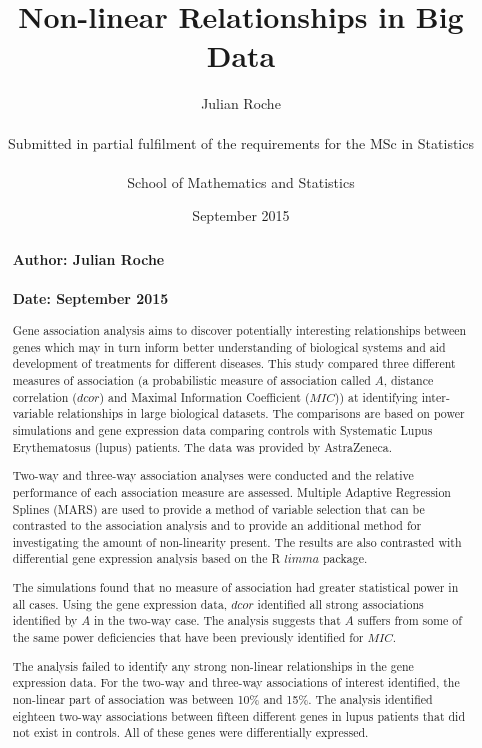 \documentclass[a4paper, 12pt]{report}
\title{Non-linear Relationships in Big Data}
\author{Julian Roche  \\  \\ Submitted in partial fulfilment of the requirements for the MSc in Statistics \\ \\ School of Mathematics and Statistics}
\date{September 2015}
\begin{document}
\pagestyle{myheadings}

\maketitle


\begin{abstract}
\subsubsection*{Author: Julian Roche}
\subsubsection*{Date: September 2015}

Gene association analysis aims to discover potentially interesting relationships between genes which may in turn inform better understanding of biological systems and aid development of treatments for different diseases. This study compared three different measures of association (a probabilistic measure of association called $A$, distance correlation ($dcor$) and Maximal Information Coefficient ($MIC$)) at identifying inter-variable relationships in large biological datasets. The comparisons are based on power simulations and gene expression data comparing controls with Systematic Lupus Erythematosus (lupus) patients. The data was provided by AstraZeneca.

Two-way and three-way association analyses were conducted and the relative performance of each association measure are assessed. Multiple Adaptive Regression Splines (MARS) are used to provide a method of variable selection that can be contrasted to the association analysis and to provide an additional method for investigating the amount of non-linearity present. The results are also contrasted with differential gene expression analysis based on the R $limma$ package.

The simulations found that no measure of association had greater statistical power in all cases. Using the gene expression data, $dcor$ identified all strong associations identified by $A$ in the two-way case. The analysis suggests that $A$ suffers from some of the same power deficiencies that have been previously identified for $MIC$.  

The analysis failed to identify any strong non-linear relationships in the gene expression data. For the two-way and three-way associations of interest identified, the non-linear part of association was between 10\% and 15\%. The analysis identified eighteen two-way associations between fifteen different genes in lupus patients that did not exist in controls. All of these genes were differentially expressed. 


\end{abstract}
\end{document}

